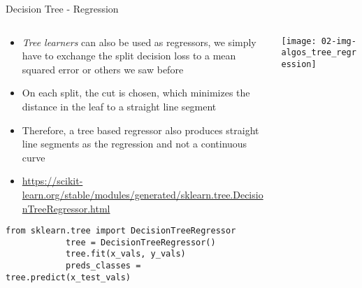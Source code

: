   \begin{frame}[fragile]{Decision Tree - Regression}
    \begin{columns}
      \begin{column}{0.65\textwidth}
        \begin{itemize}
          \item \emph{Tree learners} can also be used as regressors, we simply have to exchange the split decision loss to a mean squared error or others we saw before
          \item On each split, the cut is chosen, which minimizes the distance in the leaf to a straight line segment
          \item Therefore, a tree based regressor also produces straight line segments as the regression and not a continuous curve
          \item \small\url{https://scikit-learn.org/stable/modules/generated/sklearn.tree.DecisionTreeRegressor.html}
        \end{itemize}
        \begin{mdframed}
          \begin{lstlisting}[style=dark, gobble=10, title=\lsttitlelight{Decision Tree regression [Note: example shortened]}]
            from sklearn.tree import DecisionTreeRegressor
            tree = DecisionTreeRegressor()
            tree.fit(x_vals, y_vals)
            preds_classes = tree.predict(x_test_vals)
          \end{lstlisting}
        \end{mdframed}
      \end{column}
      \begin{column}{0.35\textwidth}
        \vspace{1em}

        \texttt{[image: 02-img-algos\_tree\_regression]}
      \end{column}
    \end{columns}
  \end{frame}


